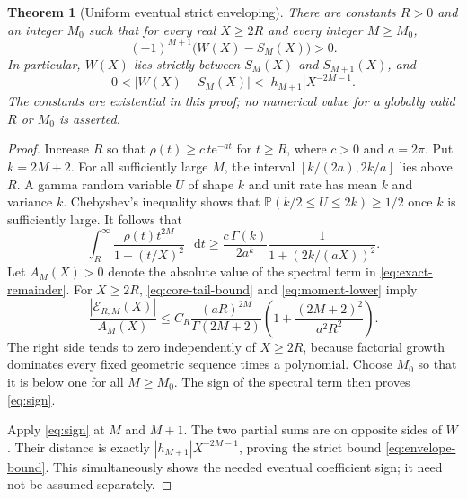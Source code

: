 \documentclass[11pt,a4paper]{article}
\newtheorem{theorem}{Theorem}[section]
\theoremstyle{definition}
\numberwithin{equation}{section}
\newcommand{\dd}{\mathop{}\!\mathrm{d}}
\newcommand{\ee}{\mathrm{e}}
\begin{document}
\begin{theorem}[Uniform eventual strict enveloping]
\label{thm:enveloping}
There are constants $R>0$ and an integer $M_0$ such that for every real $X\ge2R$ and every integer $M\ge M_0$,
\begin{equation}
 (-1)^{M+1}\bigl(W(X)-S_M(X)\bigr)>0.
 \label{eq:sign}
\end{equation}
In particular, $W(X)$ lies strictly between $S_M(X)$ and $S_{M+1}(X)$, and
\begin{equation}
 0<|W(X)-S_M(X)|<|h_{M+1}|X^{-2M-1}.
 \label{eq:envelope-bound}
\end{equation}
The constants are existential in this proof; no numerical value for a globally valid $R$ or $M_0$ is asserted.
\end{theorem}
\begin{proof}
Increase $R$ so that $\rho(t)\ge c\,t\ee^{-at}$ for $t\ge R$, where $c>0$ and $a=2\pi$. Put $k=2M+2$. For all sufficiently large $M$, the interval $[k/(2a),2k/a]$ lies above $R$. A gamma random variable $U$ of shape $k$ and unit rate has mean $k$ and variance $k$. Chebyshev's inequality shows that
$\mathbb P(k/2\le U\le2k)\ge1/2$ once $k$ is sufficiently large. It follows that
\begin{equation}
 \int_R^\infty\frac{\rho(t)t^{2M}}{1+(t/X)^2}\,\dd t
 \ge \frac{c\,\Gamma(k)}{2a^k}
       \frac1{1+(2k/(aX))^2}.
 \label{eq:moment-lower}
\end{equation}
Let $A_M(X)>0$ denote the absolute value of the spectral term in \eqref{eq:exact-remainder}. For $X\ge2R$, \eqref{eq:core-tail-bound} and \eqref{eq:moment-lower} imply
\begin{equation}
 \frac{|\mathcal E_{R,M}(X)|}{A_M(X)}
 \le C_R\frac{(aR)^{2M}}{\Gamma(2M+2)}
             \left(1+\frac{(2M+2)^2}{a^2R^2}\right).
 \label{eq:uniform-dominance}
\end{equation}
The right side tends to zero independently of $X\ge2R$, because factorial growth dominates every fixed geometric sequence times a polynomial. Choose $M_0$ so that it is below one for all $M\ge M_0$. The sign of the spectral term then proves \eqref{eq:sign}.

Apply \eqref{eq:sign} at $M$ and $M+1$. The two partial sums are on opposite sides of $W$. Their distance is exactly $|h_{M+1}|X^{-2M-1}$, proving the strict bound \eqref{eq:envelope-bound}. This simultaneously shows the needed eventual coefficient sign; it need not be assumed separately.
\end{proof}
\end{document}
